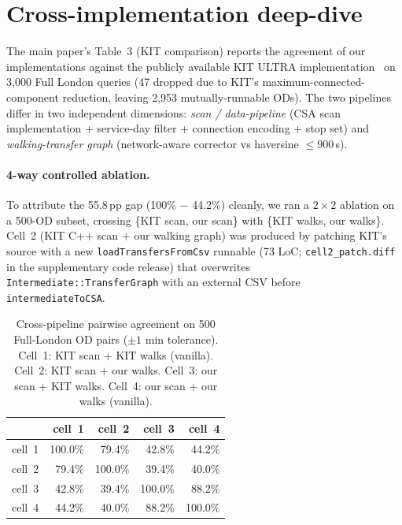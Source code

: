 \documentclass[letterpaper]{article}
\begin{document}
\section{Cross-implementation deep-dive}
\label{app:kit}

The main paper's Table~3 (KIT comparison) reports the agreement of our
implementations against the publicly available KIT ULTRA
implementation~\cite{ulra-kit} on 3{,}000 Full London queries (47
dropped due to KIT's maximum-connected-component reduction, leaving
2{,}953 mutually-runnable ODs). The two pipelines differ in two
independent dimensions: \emph{scan / data-pipeline} (CSA scan
implementation + service-day filter + connection encoding + stop set)
and \emph{walking-transfer graph} (network-aware corrector vs
haversine $\leq\!900$\,s).

\paragraph{4-way controlled ablation.} To attribute the 55.8\,pp gap
(100\% $-$ 44.2\%) cleanly, we ran a $2\times 2$ ablation on a 500-OD
subset, crossing \{KIT scan, our scan\} with \{KIT walks, our walks\}.
Cell~2 (KIT C++ scan + our walking graph) was produced by patching
KIT's source with a new \texttt{loadTransfersFromCsv} runnable
(73 LoC; \texttt{cell2\_patch.diff} in the supplementary code release)
that overwrites \texttt{Intermediate::TransferGraph} with an external
CSV before \texttt{intermediateToCSA}.

\begin{table}[H]
\centering
\caption{Cross-pipeline pairwise agreement on 500 Full-London OD pairs
($\pm 1$ min tolerance). Cell~1: KIT scan + KIT walks (vanilla).
Cell~2: KIT scan + our walks. Cell~3: our scan + KIT walks. Cell~4:
our scan + our walks (vanilla).}
\label{tab:kit-4way}
\small
\begin{tabular}{lrrrr}
\toprule
              & cell~1 & cell~2 & cell~3 & cell~4 \\
\midrule
cell~1 & 100.0\% & 79.4\% & 42.8\% & 44.2\% \\
cell~2 &  79.4\% & 100.0\% & 39.4\% & 40.0\% \\
cell~3 &  42.8\% &  39.4\% & 100.0\% & 88.2\% \\
cell~4 &  44.2\% &  40.0\% &  88.2\% & 100.0\% \\
\bottomrule
\end{tabular}
\end{table}
\end{document}
